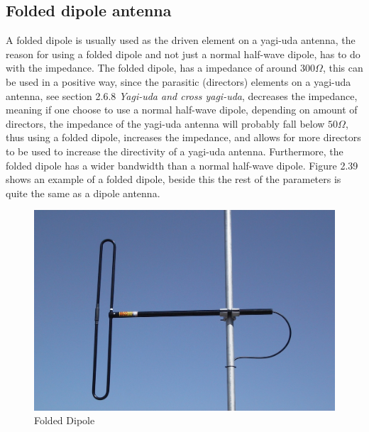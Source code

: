 \subsection{Folded dipole antenna}
A folded dipole is usually used as the driven element on a yagi-uda antenna, the reason for using a folded dipole and not just a normal half-wave dipole, has to do with the impedance. The folded dipole, has a impedance of around $300\Omega$, this can be used in a positive way, since the parasitic (directors) elements on a yagi-uda antenna, see section 2.6.8 \textit{Yagi-uda and cross yagi-uda}, decreases the impedance, meaning if one choose to use a normal half-wave dipole, depending on amount of directors, the impedance of the yagi-uda antenna will probably fall below $50\Omega$, thus using a folded dipole, increases the impedance, and allows for more directors to be used to increase the directivity of a yagi-uda antenna. Furthermore, the folded dipole has a wider bandwidth than a normal half-wave dipole. Figure 2.39 shows an example of a folded dipole, beside this the rest of the parameters is quite the same as a dipole antenna. 

\begin{figure}[h]
\centering
\includegraphics[scale=0.9]{figures/FoldedDipole.jpg}
\caption{Folded Dipole}
\end{figure}

